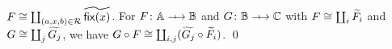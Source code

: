 \begin{lemma}\label{lem:prof-decomposition}
    \( F \cong \coprod_{(a,x,b) \in \mathcal{R}} \widetilde{\mathsf{fix}(x)} \).
    For \( F \colon \Grp \profarrow \Grpb \) and \( G \colon \Grpb \profarrow \Grpc \) with \( F \cong \coprod_i \widetilde{F_i} \) and \( G \cong \coprod_j \widetilde{G_j} \), we have \( G \circ F \cong \coprod_{i,j} (\widetilde{G_j} \circ \widetilde{F_i}) \).
    \qed
\end{lemma}


